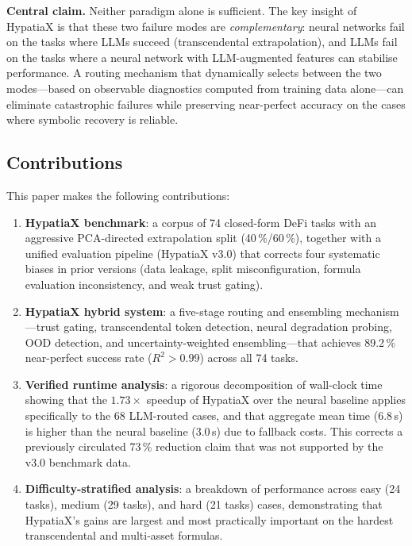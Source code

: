 \documentclass[twoside,11pt]{article}
\newcommand{\Rsq}{R^{2}}
\begin{document}
\medskip\noindent
\textbf{Central claim.}
Neither paradigm alone is sufficient.  The key insight of HypatiaX is that
these two failure modes are \emph{complementary}: neural networks fail on
the tasks where LLMs succeed (transcendental extrapolation), and LLMs fail
on the tasks where a neural network with LLM-augmented features can stabilise
performance.  A routing mechanism that dynamically selects between the two
modes---based on observable diagnostics computed from training data alone---can
eliminate catastrophic failures while preserving near-perfect accuracy on
the cases where symbolic recovery is reliable.

\subsection{Contributions}

This paper makes the following contributions:

\begin{enumerate}[leftmargin=2em,label=(\roman*)]
  \item \textbf{HypatiaX benchmark}: a corpus of 74 closed-form DeFi tasks
    with an aggressive PCA-directed extrapolation split (40\,\%/60\,\%), together
    with a unified evaluation pipeline (HypatiaX v3.0) that corrects four
    systematic biases in prior versions (data leakage, split misconfiguration,
    formula evaluation inconsistency, and weak trust gating).

  \item \textbf{HypatiaX hybrid system}: a five-stage routing and ensembling
    mechanism---trust gating, transcendental token detection, neural degradation
    probing, OOD detection, and uncertainty-weighted ensembling---that achieves
    89.2\,\% near-perfect success rate ($\Rsq>0.99$) across all 74 tasks.

  \item \textbf{Verified runtime analysis}: a rigorous decomposition of wall-clock
    time showing that the $1.73\times$ speedup of HypatiaX over the neural baseline
    applies specifically to the 68 LLM-routed cases, and that aggregate mean time
    (6.8\,s) is higher than the neural baseline (3.0\,s) due to fallback costs.
    This corrects a previously circulated 73\,\% reduction claim that was not
    supported by the v3.0 benchmark data.

  \item \textbf{Difficulty-stratified analysis}: a breakdown of performance across
    easy (24 tasks), medium (29 tasks), and hard (21 tasks) cases, demonstrating
    that HypatiaX's gains are largest and most practically important on the hardest
    transcendental and multi-asset formulas.
\end{enumerate}
\end{document}
